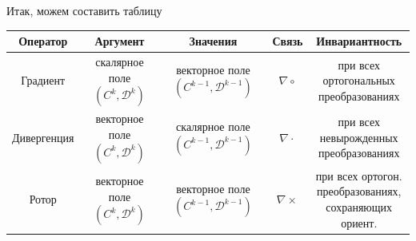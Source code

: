 \noindent Итак, можем составить таблицу
\begin{center}
{\small
\renewcommand{\arraystretch}{1.2}
\setlength{\tabcolsep}{13pt}
\begin{tabular}{|c|c|c|c|c|}
\hline
\textbf{Оператор} & \textbf{Аргумент} & \textbf{Значения} & \textbf{Связь} & \textbf{Инвариантность} \\
\hline
Градиент & \makecell{скалярное поле \\ $(C^k,\mathcal{D}^k)$} & \makecell{векторное поле \\ $(C^{k-1},\mathcal{D}^{k-1})$} & $\nabla\circ$ & \makecell{при всех \\ ортогональных \\ преобразованиях} \\
\hline
Дивергенция & \makecell{векторное поле \\ $(C^k,\mathcal{D}^k)$} & \makecell{скалярное поле \\ $(C^{k-1},\mathcal{D}^{k-1})$} & $\nabla\cdot$ & \makecell{при всех \\ невырожденных \\ преобразованиях} \\
\hline
Ротор & \makecell{векторное поле \\ $(C^k,\mathcal{D}^k)$} & \makecell{векторное поле \\ $(C^{k-1},\mathcal{D}^{k-1})$} & $\nabla\times$ & \makecell{при всех ортогон. \\ преобразованиях, \\ сохраняющих ориент.} \\
\hline
\end{tabular}
}
\end{center}
